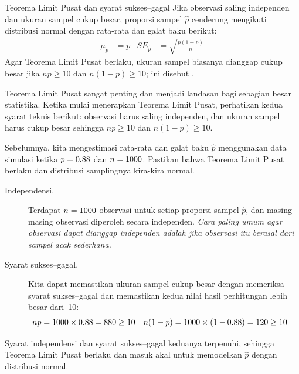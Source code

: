 \begin{onebox}{Teorema Limit Pusat dan syarat sukses--gagal}
  Jika observasi saling independen dan ukuran sampel
  cukup besar, proporsi sampel $\hat{p}$ cenderung
  mengikuti distribusi normal dengan rata-rata dan
  galat baku berikut:%
  \begin{align*}
    \mu_{\hat{p}} &= p
    &SE_{\hat{p}} &= \sqrt{\frac{p (1 - p)}{n}}
  \end{align*}
  Agar Teorema Limit Pusat berlaku,
  ukuran sampel biasanya dianggap cukup besar
  jika $np \geq 10$ dan $n(1-p) \geq 10$; ini disebut
  .
\end{onebox}

Teorema Limit Pusat sangat penting dan menjadi
landasan bagi sebagian besar statistika.
Ketika mulai menerapkan
Teorema Limit Pusat, perhatikan kedua
syarat teknis berikut:
observasi harus saling independen, dan ukuran sampel harus
cukup besar sehingga $np \geq 10$ dan $n(1-p) \geq 10$.

\begin{examplewrap}
\begin{nexample}{Sebelumnya, kita mengestimasi rata-rata dan galat
baku $\hat{p}$ menggunakan data simulasi ketika
$p = 0.88{}$ dan $n = 1000{}$.
Pastikan bahwa Teorema Limit Pusat berlaku
dan distribusi samplingnya kira-kira
normal.}\label{sample_p88_n1000_confirm_normal}
\begin{description}
\item[Independensi.] Terdapat $n = 1000{}$
    observasi untuk setiap
    proporsi sampel $\hat{p}$, dan masing-masing observasi
    diperoleh secara independen. \emph{Cara paling umum agar
    observasi dapat dianggap independen adalah jika observasi itu berasal dari
    sampel acak sederhana.}
\item[Syarat sukses--gagal.] Kita dapat memastikan ukuran sampel
    cukup besar dengan memeriksa syarat sukses--gagal
    dan memastikan kedua nilai hasil perhitungan lebih besar dari~10:
    \begin{align*}
    np &= 1000{} \times 0.88{}
        = 880{}
        \geq 10
    &n(1-p) &= 1000{} \times (1 - 0.88{})
        = 120{}
        \geq 10
    \end{align*}
\end{description}
Syarat independensi dan syarat sukses--gagal keduanya
terpenuhi, sehingga Teorema Limit Pusat berlaku dan
masuk akal untuk memodelkan $\hat{p}$ dengan distribusi normal.
\end{nexample}
\end{examplewrap}

